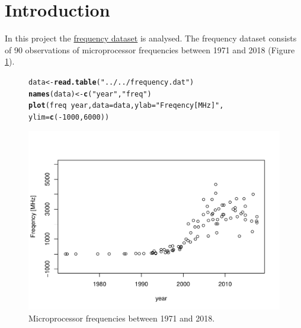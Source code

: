 \documentclass{article}\usepackage[]{graphicx}\usepackage[]{color}
\makeatletter
\newcommand{\hlnum}[1]{\textcolor[rgb]{0.686,0.059,0.569}{#1}}%
\newcommand{\hlstr}[1]{\textcolor[rgb]{0.192,0.494,0.8}{#1}}%
\newcommand{\hlopt}[1]{\textcolor[rgb]{0,0,0}{#1}}%
\newcommand{\hlstd}[1]{\textcolor[rgb]{0.345,0.345,0.345}{#1}}%
\newcommand{\hlkwb}[1]{\textcolor[rgb]{0.69,0.353,0.396}{#1}}%
\newcommand{\hlkwc}[1]{\textcolor[rgb]{0.333,0.667,0.333}{#1}}%
\newcommand{\hlkwd}[1]{\textcolor[rgb]{0.737,0.353,0.396}{\textbf{#1}}}%
\newenvironment{kframe}{%
 \def\at@end@of@kframe{}%
 \ifinner\ifhmode%
  \def\at@end@of@kframe{\end{minipage}}%
  \begin{minipage}{\columnwidth}%
 \fi\fi%
 \def\FrameCommand##1{\hskip\@totalleftmargin \hskip-\fboxsep
 \colorbox{shadecolor}{##1}\hskip-\fboxsep
     \hskip-\linewidth \hskip-\@totalleftmargin \hskip\columnwidth}%
 \MakeFramed {\advance\hsize-\width
   \@totalleftmargin\z@ \linewidth\hsize
   \@setminipage}}%
 {\par\unskip\endMakeFramed%
 \at@end@of@kframe}
\newenvironment{knitrout}{}{} %
\makeatother
\begin{document}
\section{Introduction}

In this project the \href{https://github.com/karlrupp/microprocessor-trend-data/tree/master/42yrs}{frequency dataset} is analysed. The frequency dataset consists of 90 observations of microprocessor frequencies between 1971 and 2018 (Figure \ref{fig:plot1}).

\begin{figure}
\begin{knitrout}
\color{fgcolor}\begin{kframe}
\begin{alltt}
\hlstd{data} \hlkwb{<-} \hlkwd{read.table}\hlstd{(}\hlstr{"../../frequency.dat"}\hlstd{)}
\hlkwd{names}\hlstd{(data)} \hlkwb{<-} \hlkwd{c}\hlstd{(}\hlstr{"year"}\hlstd{,} \hlstr{"freq"}\hlstd{)}
\hlkwd{plot}\hlstd{(freq} \hlopt{~} \hlstd{year,} \hlkwc{data} \hlstd{= data,} \hlkwc{ylab} \hlstd{=} \hlstr{"Freqency [MHz]"}\hlstd{,}
    \hlkwc{ylim} \hlstd{=} \hlkwd{c}\hlstd{(}\hlopt{-}\hlnum{1000}\hlstd{,} \hlnum{6000}\hlstd{))}
\end{alltt}
\end{kframe}

\includegraphics[width=1\linewidth]{figure/plot1-1} \hfill{}



\end{knitrout}
\caption{Microprocessor frequencies between 1971 and 2018.}
\label{fig:plot1}
\end{figure}
\end{document}
